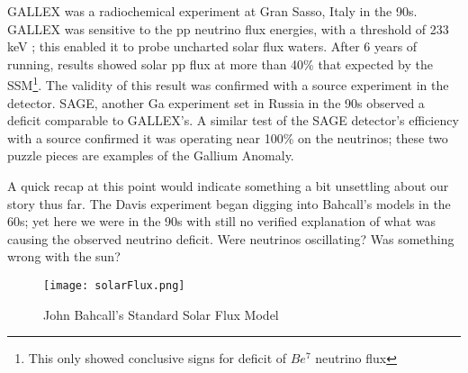 \documentclass[12pt]{article}
\begin{document}
\par GALLEX was a radiochemical experiment at Gran Sasso, Italy in the 90s. GALLEX was sensitive to the pp neutrino flux energies, with a threshold of 233 keV \cite{gal0}; this enabled it to probe uncharted solar flux waters.   After 6 years of running, results showed solar pp flux at more than 40\% that expected by the SSM\footnote{This only showed conclusive signs for deficit of $Be^7$ neutrino flux}. The validity of this result was confirmed with a  source experiment in the detector\cite{gal2}. SAGE, another Ga experiment set in Russia in the 90s observed a deficit comparable to GALLEX's.   A similar test of the SAGE detector's efficiency with a  source confirmed it was operating near 100\% on the  neutrinos\cite{sage};  these two puzzle pieces are examples of the Gallium Anomaly.  
\par A quick recap at this point would indicate something a bit unsettling about our story thus far. The Davis experiment began digging into Bahcall's models in the 60s; yet here we were in the 90s with still no verified explanation of what was causing the observed neutrino deficit.  Were neutrinos oscillating? Was something wrong with the sun\cite{Clarke}? 
\\ \begin{wrapfigure}{r}{0.5\textwidth}
\begin{center}
\captionsetup{justification=centering}
\texttt{[image: solarFlux.png]}
\end{center}
\caption{John Bahcall's Standard Solar Flux Model}
\label{fig:SSM}
\end{wrapfigure}
\end{document}
